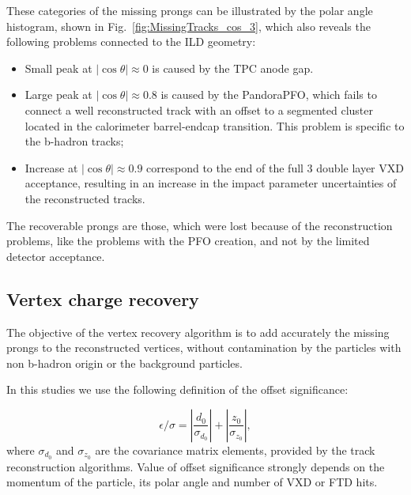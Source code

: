 These categories of the missing prongs can be illustrated by the polar angle histogram, shown in Fig.~\ref{fig:MissingTracks_cos_3}, which also reveals the following problems connected to the ILD geometry:
\begin{itemize}
\item Small peak at $|\cos\theta| \approx 0$ is caused by the TPC anode gap. 
\item Large peak at $|\cos\theta| \approx 0.8$ is caused by the PandoraPFO, which fails to connect a well reconstructed track with an offset to a segmented cluster located in the calorimeter barrel-endcap transition. This problem is specific to the b-hadron tracks;
\item Increase at $|\cos\theta| \approx 0.9$ correspond to the end of the full 3 double layer VXD acceptance, resulting in an increase in the impact parameter uncertainties of the reconstructed tracks. %
\end{itemize}

The recoverable prongs are those, which were lost because of the reconstruction problems, like the problems with the PFO creation, and not by the limited detector acceptance.  

\subsection{Vertex charge recovery}
\label{sec:VtxRecovery}
The objective of the vertex recovery algorithm is to add accurately the missing prongs to the reconstructed vertices, without contamination by the particles with non b-hadron origin or the background particles. 

% 


In this studies we use the following definition of the offset significance:

\begin{equation}
	\epsilon/\sigma = |\frac{d_0}{\sigma_{d_0}}| + |\frac{z_0 }{ \sigma_{z_0}}|,
\end{equation}
where $\sigma_{d_{0}}$ and $\sigma_{z_0}$ are the covariance matrix elements, provided by the track reconstruction algorithms.
Value of offset significance strongly depends on the momentum of the particle, its polar angle and number of VXD or FTD hits. 

